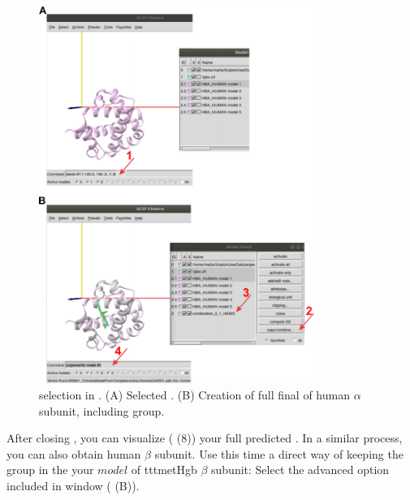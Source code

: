  \begin{figure}[H]
  \centering 
  \captionsetup{width=.7\linewidth} 
  \includegraphics[width=0.80\textwidth]{Images/Fig16}
  \caption{ selection in \chimera. (A) Selected  . (B) Creation of full final  of human  $\alpha$ subunit, including  group.}
  \label{fig:chimera_model}
  \end{figure}
 
 After closing \chimera, you can visualize ( (8)) your full predicted . In a similar process, you can also obtain human  $\beta$ subunit. %
 Use this time a direct way of keeping the  group in the your $model$ of ttt{metHgb} $\beta$ subunit: Select the advanced option  included in   window ( (B)).\\
  
